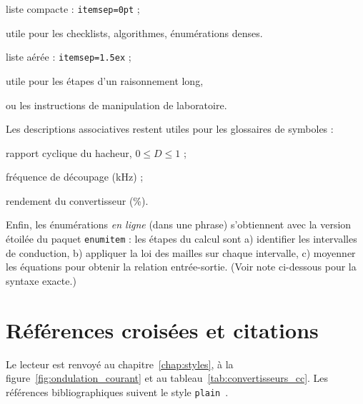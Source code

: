 
\begin{packedenum}
  \item liste compacte : \texttt{itemsep=0pt} ;
  \item utile pour les checklists, algorithmes, énumérations denses.
\end{packedenum}

\begin{airenum}
  \item liste aérée : \texttt{itemsep=1.5ex} ;
  \item utile pour les étapes d'un raisonnement long,
  \item ou les instructions de manipulation de laboratoire.
\end{airenum}

Les descriptions associatives restent utiles pour les glossaires de
symboles :

\begin{description}[font=\normalfont\bfseries\color{accenthesso}]
  \item[$D$] rapport cyclique du hacheur, $0 \le D \le 1$ ;
  \item[$f_s$] fréquence de découpage (\si{\kilo\hertz}) ;
  \item[$\eta$] rendement du convertisseur (\si{\percent}).
\end{description}

Enfin, les énumérations \emph{en ligne} (dans une phrase) s'obtiennent
avec la version étoilée du paquet \texttt{enumitem} : les étapes du
calcul sont a) identifier les intervalles de conduction, b) appliquer
la loi des mailles sur chaque intervalle, c) moyenner les équations
pour obtenir la relation entrée-sortie. (Voir note ci-dessous pour la
syntaxe exacte.)

\section{Références croisées et citations}

Le lecteur est renvoyé au chapitre~\ref{chap:styles}, à la
figure~\ref{fig:ondulation_courant} et au
tableau~\ref{tab:convertisseurs_cc}. Les références
bibliographiques suivent le style \texttt{plain}~\cite{mohan}.

